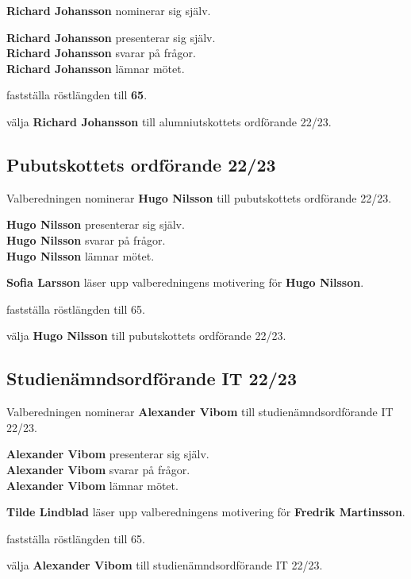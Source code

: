 \documentclass[../protokoll_varmote_2022.tex]{subfiles}
\begin{document}
\textbf{Richard Johansson} nominerar sig själv.

\textbf{Richard Johansson} presenterar sig själv.\\
\textbf{Richard Johansson} svarar på frågor.\\
\textbf{Richard Johansson} lämnar mötet.

\motetbeslutar\att{} fastställa röstlängden till \textbf{65}.

\motetbeslutar\att{} välja \textbf{Richard Johansson} till alumniutskottets ordförande 22/23.



\subsection{Pubutskottets ordförande 22/23}
Valberedningen nominerar \textbf{Hugo Nilsson} till pubutskottets ordförande 22/23.

\textbf{Hugo Nilsson} presenterar sig själv.\\
\textbf{Hugo Nilsson} svarar på frågor.\\
\textbf{Hugo Nilsson} lämnar mötet.

\textbf{Sofia Larsson} läser upp valberedningens motivering för \textbf{Hugo Nilsson}.

\motetbeslutar\att{} fastställa röstlängden till 65.

\motetbeslutar\att{} välja \textbf{Hugo Nilsson} till pubutskottets ordförande 22/23.


\subsection{Studienämndsordförande IT 22/23}
Valberedningen nominerar \textbf{Alexander Vibom} till studienämndsordförande IT 22/23.

\textbf{Alexander Vibom} presenterar sig själv.\\
\textbf{Alexander Vibom} svarar på frågor.\\
\textbf{Alexander Vibom} lämnar mötet.

\textbf{Tilde Lindblad} läser upp valberedningens motivering för \textbf{Fredrik Martinsson}.

\motetbeslutar\att{} fastställa röstlängden till 65.

\motetbeslutar\att{} välja \textbf{Alexander Vibom} till studienämndsordförande IT 22/23.
\end{document}
